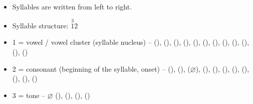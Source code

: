 \begin{refsection}
\begin{mysolution}
\begin{itemize}
    \item Syllables are written from left to right.
    \item Syllable structure: $\stackrel{3}{1} \stackrel{~}{2}$
    \item 1 = vowel / vowel cluster (syllable nucleus) --  (),  (),  (),  (),  (),  (),  (),  (),  (),  (),  (),  ()
    \item 2 = consonant (beginning of the syllable, onset) --  (),  (),  ($\varnothing$),  (),  (),  (),  (),  (),  (),  (),  ()
    \item 3 = tone -- $\varnothing$ (),  (),  (),  ()
\end{itemize}
\end{mysolution}


\end{refsection}
